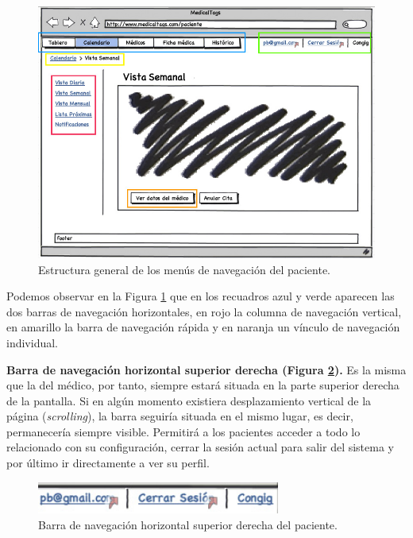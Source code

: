 \documentclass[a4paper,oneside,11pt]{book}
\begin{document}
		\begin{figure}[H]
		  \centering
		    \includegraphics[width=15cm]{img/jpg/nav/paciente.jpg}
		  \caption{Estructura general de los menús de navegación del paciente.}
		  \label{fig:nav_paciente}
		\end{figure}
		
		Podemos observar en la Figura \ref{fig:nav_paciente} que en los recuadros azul y verde aparecen las dos barras de navegación horizontales, en rojo la columna de navegación vertical, en amarillo la barra de navegación rápida y en naranja un vínculo de navegación individual.
		
		\textbf{Barra de navegación horizontal superior derecha (Figura \ref{fig:nav_paciente_sup2}).} Es la misma que la del médico, por tanto, siempre estará situada en la parte superior derecha de la pantalla. Si en algún momento existiera desplazamiento vertical de la página (\textit{scrolling}), la barra seguiría situada en el mismo lugar, es decir, permanecería siempre visible. Permitirá a los pacientes acceder a todo lo relacionado con su configuración, cerrar la sesión actual para salir del sistema y por último ir directamente a ver su perfil.
		
		\begin{figure}[H]
		  \centering
		    \includegraphics[width=8cm]{img/jpg/nav/medico_sup2.jpg}
		  \caption{Barra de navegación horizontal superior derecha del paciente.}
		  \label{fig:nav_paciente_sup2}
		\end{figure}
		
\end{document}
